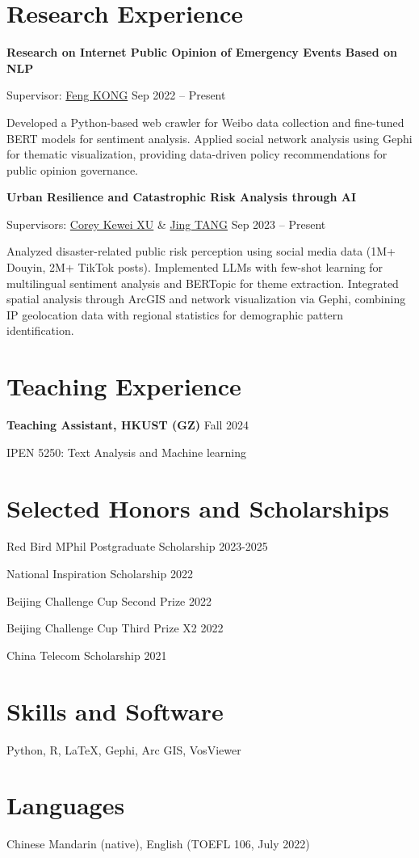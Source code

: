 \documentclass[letterpaper, 11pt]{article}
\newcommand{\sepspace}{\vspace{0.5em}}
\begin{document}
\section{Research Experience}
\textbf{Research on Internet Public Opinion of Emergency Events Based on NLP}

Supervisor: \href{https://cohd.cau.edu.cn/art/2020/11/27/art_48059_998984.html}{Feng KONG} \hfill Sep 2022 -- Present

Developed a Python-based web crawler for Weibo data collection and fine-tuned BERT models for sentiment analysis. Applied social network analysis using Gephi for thematic visualization, providing data-driven policy recommendations for public opinion governance.

\sepspace
\textbf{Urban Resilience and Catastrophic Risk Analysis through AI}

Supervisors: \href{https://facultyprofiles.hkust-gz.edu.cn/faculty-personal-page/XU-Kewei/coreyxu}{Corey Kewei XU} \& \href{https://facultyprofiles.hkust-gz.edu.cn/faculty-personal-page/TANG-Jing/jingtang}{Jing TANG} \hfill Sep 2023 -- Present

Analyzed disaster-related public risk perception using social media data (1M+ Douyin, 2M+ TikTok posts). Implemented LLMs with few-shot learning for multilingual sentiment analysis and BERTopic for theme extraction. Integrated spatial analysis through ArcGIS and network visualization via Gephi, combining IP geolocation data with regional statistics for demographic pattern identification.

\section{Teaching Experience}
\textbf{Teaching Assistant, HKUST (GZ)} \hfill Fall 2024

IPEN 5250: Text Analysis and Machine learning

\section{Selected Honors and Scholarships}
Red Bird MPhil Postgraduate Scholarship \hfill 2023-2025

National Inspiration Scholarship \hfill 2022

Beijing Challenge Cup Second Prize \hfill 2022

Beijing Challenge Cup Third Prize X2 \hfill 2022

China Telecom Scholarship \hfill 2021

\section{Skills and Software}
Python, R, \LaTeX, Gephi, Arc GIS, VosViewer

\section{Languages}
Chinese Mandarin (native), English (TOEFL 106, July 2022)
\end{document}
